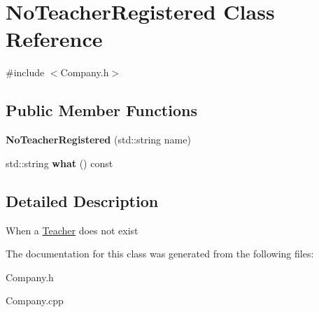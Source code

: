 \hypertarget{class_no_teacher_registered}{}\section{No\+Teacher\+Registered Class Reference}
\label{class_no_teacher_registered}


{\ttfamily \#include $<$Company.\+h$>$}

\subsection*{Public Member Functions}
\begin{DoxyCompactItemize}
\item 
\mbox{\label{class_no_teacher_registered_a1a79ff4c2def6524d60937297fa27ed3}} 
{\bfseries No\+Teacher\+Registered} (std\+::string name)
\item 
\mbox{\label{class_no_teacher_registered_af81eb37b6a596d865c3a63d9900345a1}} 
std\+::string {\bfseries what} () const
\end{DoxyCompactItemize}


\subsection{Detailed Description}
When a \mbox{\hyperlink{class_teacher}{Teacher}} does not exist 

The documentation for this class was generated from the following files\+:\begin{DoxyCompactItemize}
\item 
Company.\+h\item 
Company.\+cpp\end{DoxyCompactItemize}
